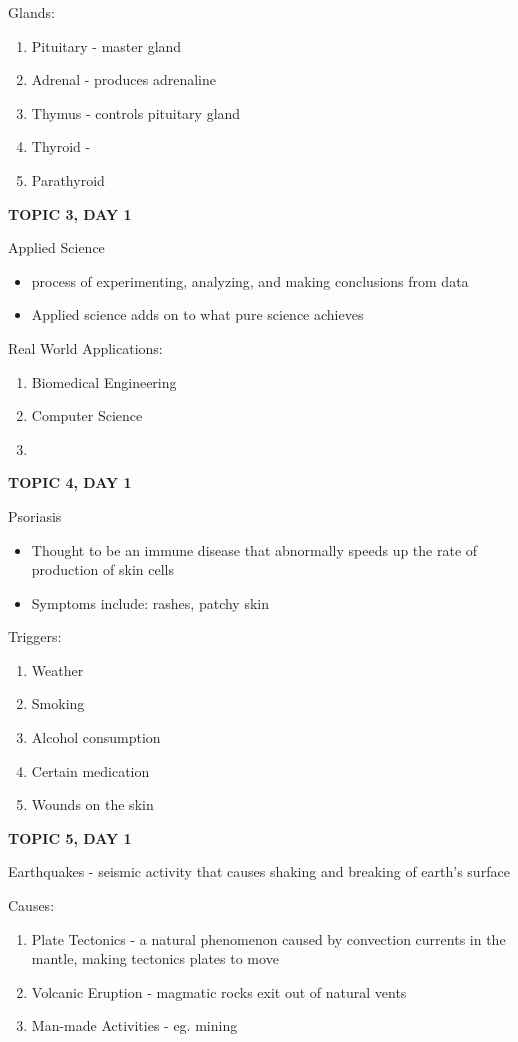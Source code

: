 {{Glands:
\begin{enumerate}
    \item Pituitary - master gland
    \item Adrenal - produces adrenaline
    \item Thymus - controls pituitary gland
    \item Thyroid - 
    \item Parathyroid
\end{enumerate}

\textbf{TOPIC 3, DAY 1}


Applied Science 
\begin{itemize}
    \item process of experimenting, analyzing, and making conclusions from data 
    \item Applied science adds on to what pure science achieves
\end{itemize}


Real World Applications:
\begin{enumerate}
    \item Biomedical Engineering
    \item Computer Science
    \item 
\end{enumerate}

\textbf{TOPIC 4, DAY 1}


Psoriasis
\begin{itemize}
    \item Thought to be an immune disease that abnormally speeds up the rate of production of skin cells
    \item Symptoms include: rashes, patchy skin
\end{itemize}


Triggers:
\begin{enumerate}
    \item Weather
    \item Smoking
    \item Alcohol consumption
    \item Certain medication
    \item Wounds on the skin
\end{enumerate}

\textbf{TOPIC 5, DAY 1}


Earthquakes - seismic activity that causes shaking and breaking of earth's surface


Causes:
\begin{enumerate}
    \item Plate Tectonics - a natural phenomenon caused by convection currents in the mantle, making tectonics plates to move
    \item Volcanic Eruption - magmatic rocks exit out of natural vents 
    \item Man-made Activities - eg. mining
\end{enumerate}

}}
